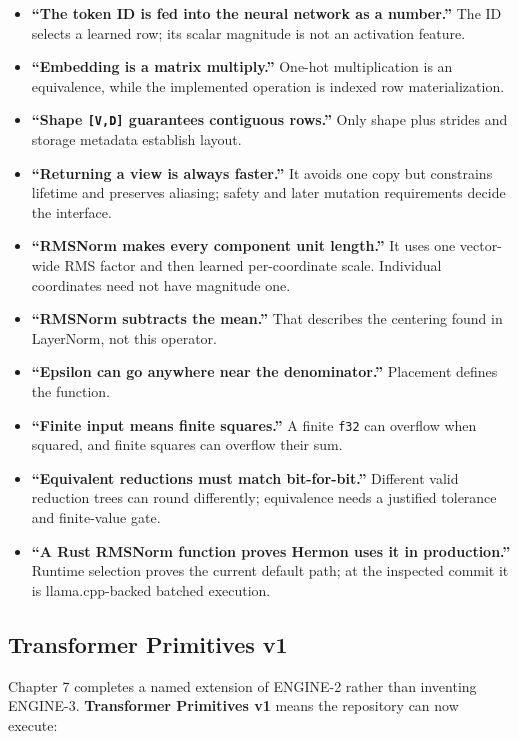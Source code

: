 \documentclass[
  10pt,
]{article}
\providecommand{\tightlist}{%
  \setlength{\itemsep}{0pt}\setlength{\parskip}{0pt}}
\begin{document}
\begin{itemize}
\tightlist
\item
  \textbf{``The token ID is fed into the neural network as a number.''}
  The ID selects a learned row; its scalar magnitude is not an
  activation feature.
\item
  \textbf{``Embedding is a matrix multiply.''} One-hot multiplication is
  an equivalence, while the implemented operation is indexed row
  materialization.
\item
  \textbf{``Shape \texttt{{[}V,D{]}} guarantees contiguous rows.''} Only
  shape plus strides and storage metadata establish layout.
\item
  \textbf{``Returning a view is always faster.''} It avoids one copy but
  constrains lifetime and preserves aliasing; safety and later mutation
  requirements decide the interface.
\item
  \textbf{``RMSNorm makes every component unit length.''} It uses one
  vector-wide RMS factor and then learned per-coordinate scale.
  Individual coordinates need not have magnitude one.
\item
  \textbf{``RMSNorm subtracts the mean.''} That describes the centering
  found in LayerNorm, not this operator.
\item
  \textbf{``Epsilon can go anywhere near the denominator.''} Placement
  defines the function.
\item
  \textbf{``Finite input means finite squares.''} A finite \texttt{f32}
  can overflow when squared, and finite squares can overflow their sum.
\item
  \textbf{``Equivalent reductions must match bit-for-bit.''} Different
  valid reduction trees can round differently; equivalence needs a
  justified tolerance and finite-value gate.
\item
  \textbf{``A Rust RMSNorm function proves Hermon uses it in
  production.''} Runtime selection proves the current default path; at
  the inspected commit it is llama.cpp-backed batched execution.
\end{itemize}

\subsection{Transformer Primitives v1}\label{transformer-primitives-v1}

Chapter 7 completes a named extension of ENGINE-2 rather than inventing
ENGINE-3. \textbf{Transformer Primitives v1} means the repository can
now execute:
\end{document}
